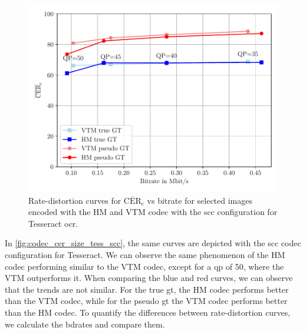 \begin{figure}
    \centering
    \includegraphics[width=\textwidth]{../images/analyze/codec_cer_size_tess_scc.pdf}
    \caption{Rate-distortion curves for $\overline{\text{CER}}_{\text{c}}$ vs bitrate for selected images encoded with the HM and VTM codec with the \gls{scc} configuration for Tesseract \gls{ocr}.}
    \label{fig:codec_cer_size_tess_scc}
\end{figure}
In \autoref{fig:codec_cer_size_tess_scc}, the same curves are depicted with the \gls{scc} codec configuration for Tesseract.
We can observe the same phenomenon of the HM codec performing similar to the VTM codec, except for a \gls{qp} of 50, where the VTM outperforms it.
When comparing the blue and red curves, we can observe that the trends are not similar.
For the true \gls{gt}, the HM codec performs better than the VTM codec, while for the pseudo \gls{gt} the VTM codec performs better than the HM codec.
To quantify the differences between rate-distortion curves, we calculate the \glspl{bdrate} and compare them.

